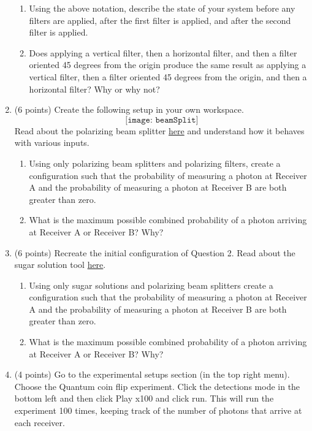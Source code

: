 \documentclass[12pt]{article}
\begin{document}
\begin{enumerate}[font=\bfseries]
\begin{enumerate}
        \item Using the above notation, describe the state of your system before any filters are applied, after the first filter is applied, and after the second filter is applied.
        \item Does applying a vertical filter, then a horizontal filter, and then a filter oriented 45 degrees from the origin produce the same result as applying a vertical filter, then a filter oriented 45 degrees from the origin, and then a horizontal filter? Why or why not?
    \end{enumerate}
    \item (6 points) Create the following setup in your own workspace.
    \[\texttt{[image: beamSplit]}\]
    Read about the polarizing beam splitter \href{https://lab.quantumflytrap.com/info/polarizing-beam-splitter}{here} and understand how it behaves with various inputs.
    \begin{enumerate}
        \item Using only polarizing beam splitters and polarizing filters, create a configuration such that the probability of measuring a photon at Receiver A and the probability of measuring a photon at Receiver B are both greater than zero.
        \item What is the maximum possible combined probability of a photon arriving at Receiver A or Receiver B? Why?
    \end{enumerate}
    \item (6 points) Recreate the initial configuration of Question 2. Read about the sugar solution tool \href{https://lab.quantumflytrap.com/info/sugar-solution}{here}.
    \begin{enumerate}
        \item Using only sugar solutions and polarizing beam splitters create a configuration such that the probability of measuring a photon at Receiver A and the probability of measuring a photon at Receiver B are both greater than zero.
        \item What is the maximum possible combined probability of a photon arriving at Receiver A or Receiver B? Why?
    \end{enumerate}
    \item (4 points) Go to the experimental setups section (in the top right menu). Choose the Quantum coin flip experiment. Click the detections mode in the bottom left and then click Play x100 and click run. This will run the experiment 100 times, keeping track of the number of photons that arrive at each receiver. 

\end{enumerate}
\end{document}
